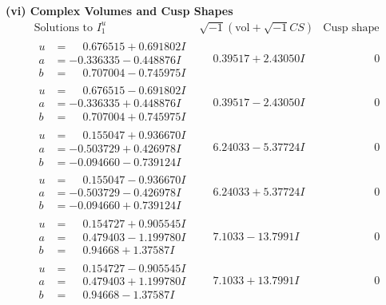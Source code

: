 \documentclass[1p]{elsarticle_modified}
\theoremstyle{definition}
\newcommand{\I}{\sqrt{-1}}
\begin{document}
\newpage\flushleft \textbf{(vi) Complex Volumes and Cusp Shapes}
$$\begin{array}{c|c|c}  
\text{Solutions to }I^u_{1}& \I (\text{vol} + \sqrt{-1}CS) & \text{Cusp shape}\\
 \hline 
\begin{aligned}
u &= \phantom{-}0.676515 + 0.691802 I \\
a &= -0.336335 - 0.448876 I \\
b &= \phantom{-}0.707004 - 0.745975 I\end{aligned}
 & \phantom{-}0.39517 + 2.43050 I & \phantom{-0.000000 } 0 \\ \hline\begin{aligned}
u &= \phantom{-}0.676515 - 0.691802 I \\
a &= -0.336335 + 0.448876 I \\
b &= \phantom{-}0.707004 + 0.745975 I\end{aligned}
 & \phantom{-}0.39517 - 2.43050 I & \phantom{-0.000000 } 0 \\ \hline\begin{aligned}
u &= \phantom{-}0.155047 + 0.936670 I \\
a &= -0.503729 + 0.426978 I \\
b &= -0.094660 - 0.739124 I\end{aligned}
 & \phantom{-}6.24033 - 5.37724 I & \phantom{-0.000000 } 0 \\ \hline\begin{aligned}
u &= \phantom{-}0.155047 - 0.936670 I \\
a &= -0.503729 - 0.426978 I \\
b &= -0.094660 + 0.739124 I\end{aligned}
 & \phantom{-}6.24033 + 5.37724 I & \phantom{-0.000000 } 0 \\ \hline\begin{aligned}
u &= \phantom{-}0.154727 + 0.905545 I \\
a &= \phantom{-}0.479403 - 1.199780 I \\
b &= \phantom{-}0.94668 + 1.37587 I\end{aligned}
 & \phantom{-}7.1033 - 13.7991 I & \phantom{-0.000000 } 0 \\ \hline\begin{aligned}
u &= \phantom{-}0.154727 - 0.905545 I \\
a &= \phantom{-}0.479403 + 1.199780 I \\
b &= \phantom{-}0.94668 - 1.37587 I\end{aligned}
 & \phantom{-}7.1033 + 13.7991 I & \phantom{-0.000000 } 0 \\ \hline\begin{aligned}

\end{aligned}
\end{array}$$
\end{document}
